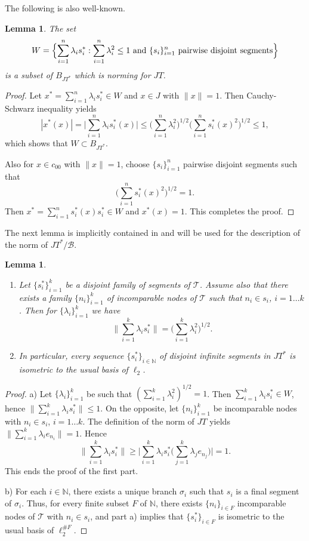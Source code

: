 \documentclass[12pt]{amsart}
\theoremstyle{plain}
\numberwithin{equation}{section}
\newcommand{\N}{\mathbb{N}}
\newcommand{\Tree}{\mathcal{T}}
\newcommand{\B}{\mathcal{B}}
\newtheorem{lemma}[theorem]{Lemma}
\begin{document}
The following is also well-known.

\begin{lemma}\label{L3}
The set
\begin{equation}
W = \Bigl\{ \sum_{i=1}^n \lambda_i s_i^* : \sum_{i=1}^n \lambda_i^2 \leq 1 \text{ and } \{s_i\}_{i=1}^n \text{ pairwise disjoint segments} \Bigr\}
\end{equation}
is a subset of $B_{JT^*}$ which is norming for $JT$.
\end{lemma}
\begin{proof}
Let $x^* = \sum_{i=1}^n \lambda_i s_i^* \in W$ and $x\in J$ with $\|x\|=1$. Then Cauchy-Schwarz inequality yields
\[ |x^*(x)| = \Big| \sum_{i=1}^n \lambda_i s_i^*(x) \Big| \leq \Big( \sum_{i=1}^n \lambda_i^2\Big)^{1/2} \Big( \sum_{i=1}^n s_i^*(x)^2\Big)^{1/2} \leq 1, \]
which shows that $W \subset B_{JT^*}$.

Also for $x\in c_{00}$ with $\|x\| = 1$, choose $\{s_i\}_{i=1}^n$ pairwise disjoint segments such that
\[ \Big( \sum_{i=1}^n s_i^*(x)^2\Big)^{1/2} = 1. \]
Then $x^* = \sum_{i=1}^n s_i^*(x)s_i^*\in W$ and $x^*(x) = 1$. This completes the proof.
\end{proof}

The next lemma is implicitly contained in \cite{LS} and will be used for the description of the norm of $JT^*/\B$.

\begin{lemma} \label{L2}
\begin{enumerate}
    \item[a)] Let $\{s_i^*\}_{i=1}^k$ be a disjoint family of segments of $\Tree$. Assume also that there exists a family $\{n_i\}_{i=1}^k$ of incomparable nodes of $\Tree$ such that $n_i \in s_i$, $i= 1 \dots k$. Then for $\{\lambda_i\}_{i=1}^k$ we have
    \[\Big\|\sum_{i=1}^k \lambda_i s_i^* \Big\|= \Big(\sum_{i=1}^k \lambda_i^2\Big)^{1/2}.\]
    \item[b)] In particular, every sequence $\{s_i^*\}_{i\in \N}$ of disjoint infinite segments in $JT^*$ is isometric to the usual basis of $\ell_2$.
\end{enumerate}
\end{lemma}
\begin{proof}
a) Let $\{\lambda_i\}_{i=1}^k$ be such that $(\sum_{i=1}^k \lambda_i^2)^{1/2} = 1$. Then $\sum_{i=1}^k \lambda_i s_i^*\in W$, hence $\|\sum_{i=1}^k \lambda_i s_i^*\| \leq 1$. On the opposite, let $\{n_i\}_{i=1}^k$ be incomparable nodes with $n_i \in s_i$, $i= 1 \dots k$. The definition of the norm of $JT$ yields $\|\sum_{i=1}^k \lambda_i e_{n_i}\| = 1$. Hence
\[ \Big\| \sum_{i=1}^k \lambda_i s_i^*\Big\| \geq \Big| \sum_{i=1}^k \lambda_i s_i^*\Big( \sum_{j=1}^k \lambda_j e_{n_j} \Big) \Big| = 1. \]
This ends the proof of the first part.

b) For each $i\in \N$, there exists a unique branch $\sigma_i$ such that $s_i$ is a final segment of $\sigma_i$. Thus, for every finite subset $F$ of $\N$, there exists $\{n_i\}_{i \in F}$ incomparable nodes of $\Tree$ with $n_i \in s_i$, and part a) implies that $\{s_i^* \}_{i\in F}$ is isometric to the usual basis of $\ell_2^{\#F}$.
\end{proof}
\end{document}
